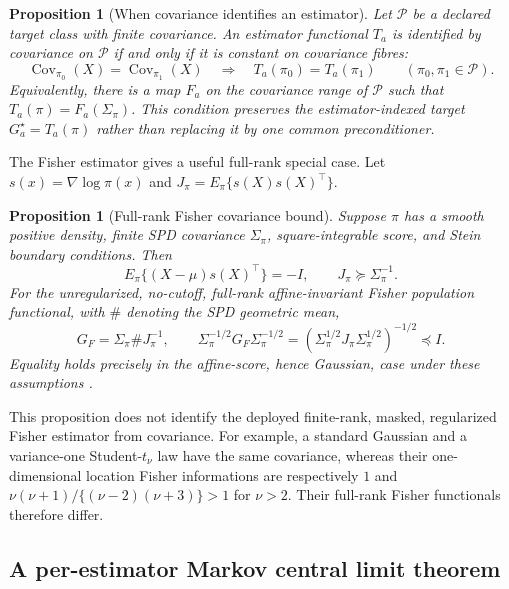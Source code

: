 \documentclass[11pt]{article}
\theoremstyle{plain}
\newtheorem{proposition}[theorem]{Proposition}
\theoremstyle{definition}
\theoremstyle{remark}
\begin{document}
\begin{proposition}[When covariance identifies an estimator]\label{prop:fibre}
Let $\mathcal P$ be a declared target class with finite covariance. An estimator
functional $T_a$ is identified by covariance on $\mathcal P$ if and only if it
is constant on covariance fibres:
\[
 \operatorname{Cov}_{\pi_0}(X)=\operatorname{Cov}_{\pi_1}(X)
 \quad\Longrightarrow\quad T_a(\pi_0)=T_a(\pi_1)
 \qquad(\pi_0,\pi_1\in\mathcal P).
\]
Equivalently, there is a map $F_a$ on the covariance range of $\mathcal P$ such
that $T_a(\pi)=F_a(\Sigma_\pi)$. This condition preserves the estimator-indexed
target $G_a^\star=T_a(\pi)$ rather than replacing it by one common
preconditioner.
\end{proposition}

The Fisher estimator gives a useful full-rank special case. Let
$s(x)=\nabla\log\pi(x)$ and
$J_\pi=E_\pi\{s(X)s(X)^\top\}$.

\begin{proposition}[Full-rank Fisher covariance bound]\label{prop:fisher}
Suppose $\pi$ has a smooth positive density, finite SPD covariance
$\Sigma_\pi$, square-integrable score, and Stein boundary conditions. Then
\[
 E_\pi\{(X-\mu)s(X)^\top\}=-I,\qquad
 J_\pi\succeq\Sigma_\pi^{-1}.
\]
For the unregularized, no-cutoff, full-rank affine-invariant Fisher population
functional, with $\#$ denoting the SPD geometric mean,
\[
 G_F=\Sigma_\pi\#J_\pi^{-1},\qquad
 \Sigma_\pi^{-1/2}G_F\Sigma_\pi^{-1/2}
 =(\Sigma_\pi^{1/2}J_\pi\Sigma_\pi^{1/2})^{-1/2}\preceq I.
\]
Equality holds precisely in the affine-score, hence Gaussian, case under these
assumptions \citep{dembo1991information}.
\end{proposition}

This proposition does not identify the deployed finite-rank, masked,
regularized Fisher estimator from covariance. For example, a standard Gaussian and
a variance-one Student-$t_\nu$ law have the same covariance, whereas their
one-dimensional location Fisher informations are respectively $1$ and
$\nu(\nu+1)/\{(\nu-2)(\nu+3)\}>1$ for $\nu>2$. Their full-rank Fisher
functionals therefore differ.

\subsection{A per-estimator Markov central limit theorem}
\end{document}
